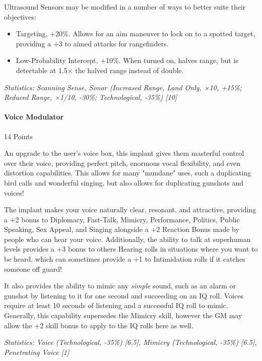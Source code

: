 \begin{multicols*}{3}
	Ultrasound Sensors may be modified in a number of ways to better suite their objectives:
	\begin{itemize}
		\item Targeting, +20\%. Allows for an aim maneuver to lock on to a spotted target, providing a +3 to aimed attacks for rangefinders.
		\item Low-Probability Intercept, +10\%. When turned on, halves range, but is detectable at 1.5× the halved range instead of double.
	\end{itemize}
	
	\textit{\textcolor{OliveGreen}{Statistics: Scanning Sense, Sonar (Increased Range, Land Only, ×10, +15\%; Reduced Range, ×1/10, -30\%; Technological, -35\%) [10]}}
	
	\paragraph{Voice Modulator}
	\begin{flushright}
		14 Points
	\end{flushright}

	An upgrade to the user's voice box, this implant gives them masterful control over their voice, providing perfect pitch, enormous vocal flexibility, and even distortion capabilities. This allows for many "mundane" uses, such a duplicating bird calls and wonderful singing, but also allows for duplicating gunshots and voices!
	
	The implant makes your voice naturally clear, resonant, and attractive, providing a +2 bonus to Diplomacy, Fast-Talk, Mimicry, Performance, Politics, Public Speaking, Sex Appeal, and Singing alongside a +2 Reaction Bonus made by people who can hear your voice. Additionally, the ability to talk at superhuman levels provides a +3 bonus to others Hearing rolls in situations where you want to be heard, which can sometimes provide a +1 to Intimidation rolls if it catches someone off guard!
	
	It also provides the ability to mimic any \textit{simple} sound, such as an alarm or gunshot by listening to it for one second and succeeding on an IQ roll. Voices require at least 10 seconds of listening and a successful IQ roll to mimic. Generally, this capability supersedes the Mimicry skill, however the GM may allow the +2 skill bonus to apply to the IQ rolls here as well. 

	\textit{\textcolor{OliveGreen}{Statistics: Voice (Technological, -35\%) [6.5], Mimicry (Technological, -35\%) [6.5], Penetrating Voice [1] }}
	

\end{multicols*}
